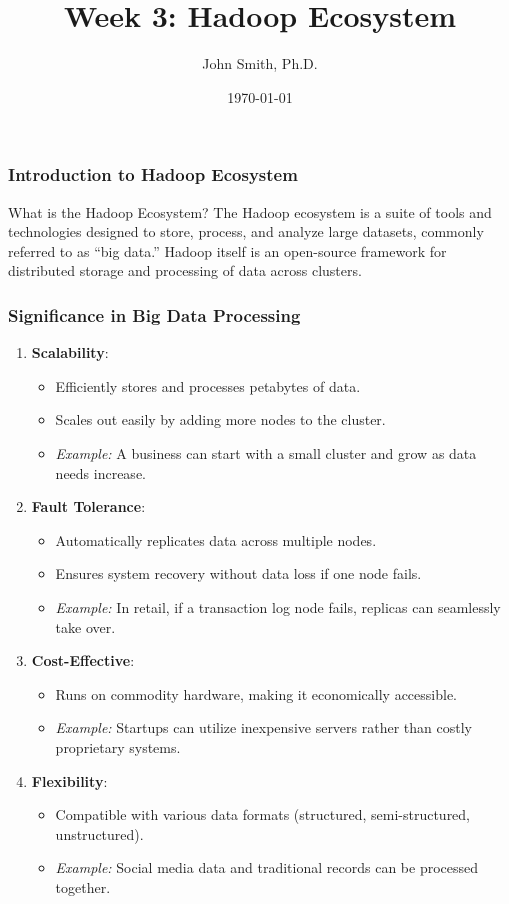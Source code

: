 \documentclass[aspectratio=169]{beamer}
\title[Week 3: Hadoop Ecosystem]{Week 3: Hadoop Ecosystem}
\author[J. Smith]{John Smith, Ph.D.}
\institute[University Name]{
  Department of Computer Science\\
  University Name\\
  \vspace{0.3cm}
  Email: email@university.edu\\
  Website: www.university.edu
}
\date{\today}
\begin{document}
\frame{\titlepage}

\begin{frame}[fragile]
    \frametitle{Introduction to Hadoop Ecosystem}
    \begin{block}{What is the Hadoop Ecosystem?}
        The Hadoop ecosystem is a suite of tools and technologies designed to store, process, and analyze large datasets, commonly referred to as “big data.” Hadoop itself is an open-source framework for distributed storage and processing of data across clusters.
    \end{block}
\end{frame}

\begin{frame}[fragile]
    \frametitle{Significance in Big Data Processing}
    \begin{enumerate}
        \item \textbf{Scalability}:
            \begin{itemize}
                \item Efficiently stores and processes petabytes of data.
                \item Scales out easily by adding more nodes to the cluster.
                \item \textit{Example:} A business can start with a small cluster and grow as data needs increase.
            \end{itemize}

        \item \textbf{Fault Tolerance}:
            \begin{itemize}
                \item Automatically replicates data across multiple nodes.
                \item Ensures system recovery without data loss if one node fails.
                \item \textit{Example:} In retail, if a transaction log node fails, replicas can seamlessly take over.
            \end{itemize}

        \item \textbf{Cost-Effective}:
            \begin{itemize}
                \item Runs on commodity hardware, making it economically accessible.
                \item \textit{Example:} Startups can utilize inexpensive servers rather than costly proprietary systems.
            \end{itemize}

        \item \textbf{Flexibility}:
            \begin{itemize}
                \item Compatible with various data formats (structured, semi-structured, unstructured).
                \item \textit{Example:} Social media data and traditional records can be processed together.
            \end{itemize}
    \end{enumerate}
\end{frame}
\end{document}
